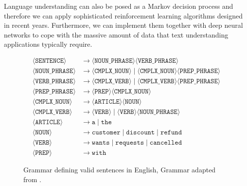 Language understanding can also be posed as a Markov decision process and therefore we can apply sophisticated reinforcement learning algorithms designed in recent years. Furthermore, we can implement them together with deep neural networks to cope with the massive amount of data that text understanding applications typically require. 
\begin{figure}[h!]
\begin{align*}
 \langle\mathtt{SENTENCE}\rangle &\rightarrow \langle\mathtt{NOUN\_PHRASE}\rangle \langle\mathtt{VERB\_PHRASE}\rangle\\
\langle\mathtt{NOUN\_PHRASE}\rangle &\rightarrow \langle\mathtt{CMPLX\_NOUN}\rangle \; | \;  \langle\mathtt{CMPLX\_NOUN}\rangle \langle\mathtt{PREP\_PHRASE}\rangle \\
 \langle\mathtt{VERB\_PHRASE}\rangle & \rightarrow \langle\mathtt{CMPLX\_VERB}\rangle \; | \;  \langle\mathtt{CMPLX\_VERB}\rangle \langle\mathtt{PREP\_PHRASE}\rangle \\
 \langle\mathtt{PREP\_PHRASE}\rangle & \rightarrow \langle\mathtt{PREP}\rangle \langle\mathtt{CMPLX\_NOUN}\rangle \\
 \langle\mathtt{CMPLX\_NOUN}\rangle & \rightarrow \langle\mathtt{ARTICLE}\rangle \langle\mathtt{NOUN}\rangle \\
 \langle\mathtt{CMPLX\_VERB}\rangle & \rightarrow \langle\mathtt{VERB}\rangle \; | \; \langle\mathtt{VERB}\rangle \langle\mathtt{NOUN\_PHRASE}\rangle \\
 \langle\mathtt{ARTICLE}\rangle & \rightarrow \mathtt{a} \; | \;  \mathtt{the} \\
 \langle\mathtt{NOUN}\rangle & \rightarrow \mathtt{customer} \; | \; \mathtt{discount} \; | \; \mathtt{refund} \\
 \langle\mathtt{VERB}\rangle & \rightarrow \mathtt{wants} \; | \; \mathtt{requests} \; | \; \mathtt{cancelled} \\
 \langle\mathtt{PREP}\rangle & \rightarrow \mathtt{with}
 \end{align*}
\caption{Grammar defining valid sentences in English, Grammar adapted from .}
\label{grammar02}
\end{figure}
